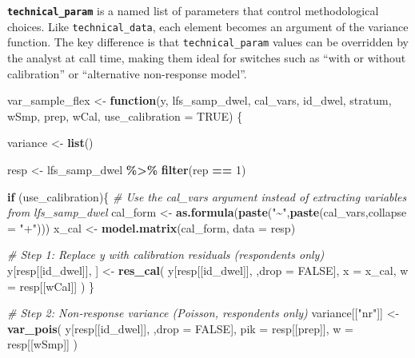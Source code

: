\documentclass[
]{article}
\newenvironment{Shaded}{\begin{snugshade}}{\end{snugshade}}
\newcommand{\AttributeTok}[1]{\textcolor[rgb]{0.13,0.29,0.53}{#1}}
\newcommand{\CommentTok}[1]{\textcolor[rgb]{0.56,0.35,0.01}{\textit{#1}}}
\newcommand{\ConstantTok}[1]{\textcolor[rgb]{0.56,0.35,0.01}{#1}}
\newcommand{\ControlFlowTok}[1]{\textcolor[rgb]{0.13,0.29,0.53}{\textbf{#1}}}
\newcommand{\DecValTok}[1]{\textcolor[rgb]{0.00,0.00,0.81}{#1}}
\newcommand{\FunctionTok}[1]{\textcolor[rgb]{0.13,0.29,0.53}{\textbf{#1}}}
\newcommand{\NormalTok}[1]{#1}
\newcommand{\OtherTok}[1]{\textcolor[rgb]{0.56,0.35,0.01}{#1}}
\newcommand{\SpecialCharTok}[1]{\textcolor[rgb]{0.81,0.36,0.00}{\textbf{#1}}}
\newcommand{\StringTok}[1]{\textcolor[rgb]{0.31,0.60,0.02}{#1}}
\begin{document}
\textbf{\texttt{technical\_param}} is a named list of parameters that
control methodological choices. Like \texttt{technical\_data}, each
element becomes an argument of the variance function. The key difference
is that \texttt{technical\_param} values can be overridden by the
analyst at call time, making them ideal for switches such as ``with or
without calibration'' or ``alternative non-response model''.

\begin{Shaded}
\begin{Highlighting}[]
\NormalTok{var\_sample\_flex }\OtherTok{\textless{}{-}} \ControlFlowTok{function}\NormalTok{(y, lfs\_samp\_dwel, cal\_vars, id\_dwel, stratum, }
\NormalTok{                            wSmp, prep, wCal, }\AttributeTok{use\_calibration =} \ConstantTok{TRUE}\NormalTok{) \{}
  
\NormalTok{  variance }\OtherTok{\textless{}{-}} \FunctionTok{list}\NormalTok{()}
  
\NormalTok{  resp }\OtherTok{\textless{}{-}}\NormalTok{ lfs\_samp\_dwel }\SpecialCharTok{\%\textgreater{}\%} \FunctionTok{filter}\NormalTok{(rep }\SpecialCharTok{==} \DecValTok{1}\NormalTok{)}
  
  \ControlFlowTok{if}\NormalTok{ (use\_calibration)\{}
    \CommentTok{\# Use the cal\_vars argument instead of extracting variables from lfs\_samp\_dwel}
\NormalTok{    cal\_form }\OtherTok{\textless{}{-}} \FunctionTok{as.formula}\NormalTok{(}\FunctionTok{paste}\NormalTok{(}\StringTok{"\textasciitilde{}"}\NormalTok{,}\FunctionTok{paste}\NormalTok{(cal\_vars,}\AttributeTok{collapse =} \StringTok{"+"}\NormalTok{)))}
\NormalTok{    x\_cal }\OtherTok{\textless{}{-}} \FunctionTok{model.matrix}\NormalTok{(cal\_form, }\AttributeTok{data =}\NormalTok{ resp)}
    
    \CommentTok{\# Step 1: Replace y with calibration residuals (respondents only)}
\NormalTok{    y[resp[[id\_dwel]], ] }\OtherTok{\textless{}{-}} \FunctionTok{res\_cal}\NormalTok{(}
\NormalTok{      y[resp[[id\_dwel]], ,}\AttributeTok{drop =} \ConstantTok{FALSE}\NormalTok{],}
      \AttributeTok{x =}\NormalTok{ x\_cal,}
      \AttributeTok{w =}\NormalTok{ resp[[wCal]]}
\NormalTok{    )}
\NormalTok{  \}}
  
  \CommentTok{\# Step 2: Non{-}response variance (Poisson, respondents only)}
\NormalTok{  variance[[}\StringTok{"nr"}\NormalTok{]] }\OtherTok{\textless{}{-}} \FunctionTok{var\_pois}\NormalTok{(}
\NormalTok{    y[resp[[id\_dwel]], ,}\AttributeTok{drop =} \ConstantTok{FALSE}\NormalTok{],}
    \AttributeTok{pik =}\NormalTok{ resp[[prep]],}
    \AttributeTok{w   =}\NormalTok{ resp[[wSmp]]}
\NormalTok{  )}
  

\end{Highlighting}
\end{Shaded}
\end{document}
